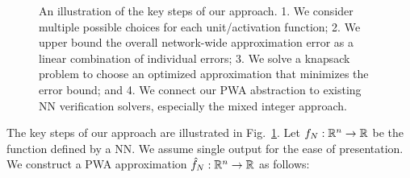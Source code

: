 \begin{figure}[t]
    \centering
    \resizebox{0.6\linewidth}{!}{}
    \caption{An illustration of the key steps of our approach. 1. We consider multiple possible choices for each unit/activation function; 2. We upper bound the overall network-wide approximation error as a linear combination of individual errors; 3. We solve a knapsack problem to choose an optimized approximation that minimizes the error bound; and 4. We connect our PWA abstraction to existing NN verification solvers, especially the mixed integer approach.}
    \label{fig:approach-flow}
\end{figure}

The key steps of our approach are illustrated in Fig.~\ref{fig:approach-flow}. Let $f_N: \mathbb{R}^n \rightarrow \mathbb{R}$ be the function defined by a NN. We assume single output for the ease of presentation. We construct a PWA approximation $\hat{f}_N: \mathbb{R}^n \rightarrow \mathbb{R}$ as follows: 

